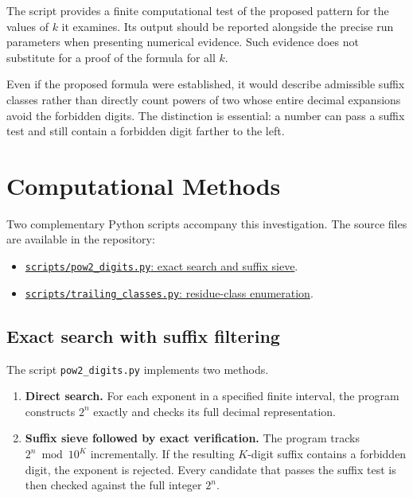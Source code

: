 \documentclass[11pt,a4paper]{article}
\theoremstyle{definition}
\theoremstyle{plain}
\theoremstyle{remark}
\begin{document}
The script provides a finite computational test of the proposed
pattern for the values of \(k\) it examines. Its output should be
reported alongside the precise run parameters when presenting
numerical evidence. Such evidence does not substitute for a proof
of the formula for all \(k\).

Even if the proposed formula were established, it would describe
admissible suffix classes rather than directly count powers of two
whose entire decimal expansions avoid the forbidden digits.
The distinction is essential: a number can pass a suffix test
and still contain a forbidden digit farther to the left.

\section{Computational Methods}

Two complementary Python scripts accompany this investigation.
The source files are available in the repository:

\begin{itemize}
    \item \href{https://github.com/IronMan1405/mathematical_proofs/blob/main/scripts/pow2_digits.py}
    {\texttt{scripts/pow2\_digits.py}: exact search and suffix sieve}.
    \item \href{https://github.com/IronMan1405/mathematical_proofs/blob/main/scripts/trailing_classes.py}
    {\texttt{scripts/trailing\_classes.py}: residue-class enumeration}.
\end{itemize}

\subsection{Exact search with suffix filtering}

The script \texttt{pow2\_digits.py} implements two methods.

\begin{enumerate}
    \item \textbf{Direct search.} For each exponent in a specified
    finite interval, the program constructs \(2^n\) exactly and
    checks its full decimal representation.

    \item \textbf{Suffix sieve followed by exact verification.}
    The program tracks \(2^n\bmod 10^K\) incrementally. If the
    resulting \(K\)-digit suffix contains a forbidden digit, the
    exponent is rejected. Every candidate that passes the suffix
    test is then checked against the full integer \(2^n\).
\end{enumerate}
\end{document}

